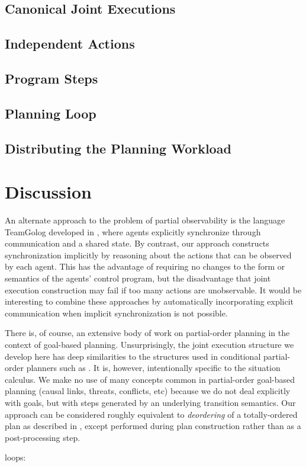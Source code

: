 \subsection{Canonical Joint Executions}


\subsection{Independent Actions\label{sec:JointExec:IndepActs}}


\subsection{Program Steps}


\subsection{Planning Loop}


\subsection{Distributing the Planning Workload}




\section{Discussion\label{sec:JointExec:Discussion}}

An alternate approach to the problem of partial observability is the
language TeamGolog developed in \citep{farinelli07team_golog}, where
agents explicitly synchronize through communication and a shared state.
By contrast, our approach constructs synchronization implicitly by
reasoning about the actions that can be observed by each agent. This
has the advantage of requiring no changes to the form or semantics
of the agents' control program, but the disadvantage that joint execution
construction may fail if too many actions are unobservable. It would
be interesting to combine these approaches by automatically incorporating
explicit communication when implicit synchronization is not possible.

There is, of course, an extensive body of work on partial-order planning
in the context of goal-based planning. Unsurprisingly, the joint execution
structure we develop here has deep similarities to the structures
used in conditional partial-order planners such as \citep{peot92conditional_nonlinear}.
It is, however, intentionally specific to the situation calculus.
We make no use of many concepts common in partial-order goal-based
planning (causal links, threats, conflicts, etc) because we do not
deal explicitly with goals, but with steps generated by an underlying
transition semantics. Our approach can be considered roughly equivalent
to \emph{deordering} of a totally-ordered plan as described in \citep{backstrom99reordering},
except performed during plan construction rather than as a post-processing
step.

loops: \citep{levesque96what_is_planning,levesque05planning_with_loops}

